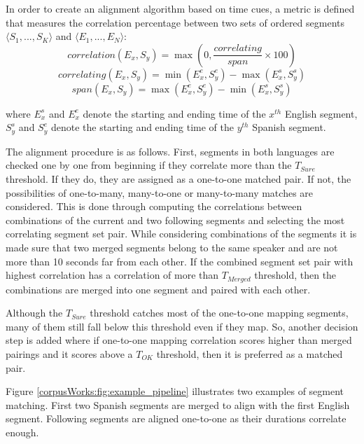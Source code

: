 In order to create an alignment algorithm based on time cues, a metric is defined that measures the correlation percentage between two sets of ordered segments $\langle S_1, ...,  S_K\rangle$ and $\langle E_1, ...,  E_N\rangle$:
\begin{equation}
    \textit{correlation}(E_x, S_y) = \max(0,\dfrac{\textit{correlating}}{\textit{span}} \times 100)
\end{equation}
\begin{equation}
    \textit{correlating}(E_x, S_y) = \min(E_x^e, S_y^e) - \max(E_x^s, S_y^s)
\end{equation}
\begin{equation}
    \textit{span}(E_x, S_y) = \max(E_x^e, S_y^e) - \min(E_x^s, S_y^s)
\end{equation}

where $E_x^s$ and $E_x^e$ denote the starting and ending time of the $x^{th}$ English segment, $S_y^s$ and $S_y^e$ denote the starting and ending time of the $y^{th}$ Spanish segment. 

The alignment procedure is as follows. First, segments in both languages are checked one by one from beginning if they correlate more than the $T_{Sure}$ threshold. If they do, they are assigned as a one-to-one matched pair. If not, the possibilities of one-to-many, many-to-one or many-to-many matches are considered. This is done through computing the correlations between combinations of the current and two following segments and selecting the most correlating segment set pair. While considering combinations of the segments it is made sure that two merged segments belong to the same speaker and are not more than 10 seconds far from each other. If the combined segment set pair with highest correlation has a correlation of more than $T_{Merged}$ threshold, then the combinations are merged into one segment and paired with each other. 

Although the $T_{Sure}$ threshold catches most of the one-to-one mapping segments, many of them still fall below this threshold even if they map. So, another decision step is added where if one-to-one mapping correlation scores higher than merged pairings and it scores above a $T_{OK}$ threshold, then it is preferred as a matched pair. 

Figure \ref{corpusWorks:fig:example_pipeline} illustrates two examples of segment matching. First two Spanish segments are merged to align with the first English segment. Following segments are aligned one-to-one as their durations correlate enough.

